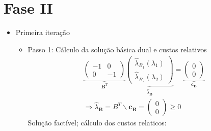 \documentclass{article}
\begin{document}
\section{Fase II}
\begin{itemize}
\item Primeira iteração
\begin{itemize}
\item Passo 1: Cálculo da solução básica dual e custos relativos
$$
\begin{gathered}
\underbrace{\left(\begin{array}{cc}
-1 & 0 \\
0 & -1
\end{array}\right)}_{\mathbf{B}^{T}} \underbrace{\left(\begin{array}{l}
\hat{\lambda}_{B_{1}}\left(\lambda_{1}\right) \\
\hat{\lambda}_{B_{2}}\left(\lambda_{2}\right)
\end{array}\right)}_{\hat{\lambda}_{\mathbf{B}}}=\underbrace{\left(\begin{array}{l}
0 \\
0
\end{array}\right)}_{\mathbf{c}_{\mathbf{B}}} \\
\Rightarrow \hat{\lambda}_{\mathbf{B}}=B^{T} \backslash \mathbf{c}_{\mathbf{B}}=\left(\begin{array}{l}
0 \\
0
\end{array}\right) \geq 0
\end{gathered}
$$
Solução factível; cálculo dos custos relaticos: 


\end{itemize}
\end{itemize}
\end{document}
